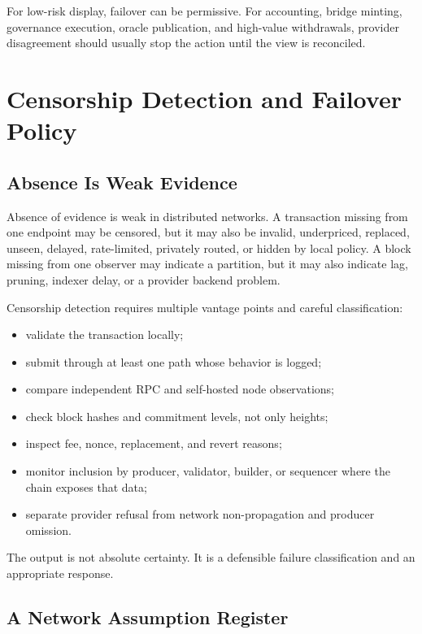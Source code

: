 For low-risk display, failover can be permissive. For accounting, bridge minting, governance execution, oracle publication, and high-value withdrawals, provider disagreement should usually stop the action until the view is reconciled.

\section{Censorship Detection and Failover Policy}

\subsection{Absence Is Weak Evidence}

Absence of evidence is weak in distributed networks. A transaction missing from one endpoint may be censored, but it may also be invalid, underpriced, replaced, unseen, delayed, rate-limited, privately routed, or hidden by local policy. A block missing from one observer may indicate a partition, but it may also indicate lag, pruning, indexer delay, or a provider backend problem.

Censorship detection requires multiple vantage points and careful classification:

\begin{itemize}
\item validate the transaction locally;
\item submit through at least one path whose behavior is logged;
\item compare independent RPC and self-hosted node observations;
\item check block hashes and commitment levels, not only heights;
\item inspect fee, nonce, replacement, and revert reasons;
\item monitor inclusion by producer, validator, builder, or sequencer where the chain exposes that data;
\item separate provider refusal from network non-propagation and producer omission.
\end{itemize}

The output is not absolute certainty. It is a defensible failure classification and an appropriate response.

\subsection{A Network Assumption Register}

